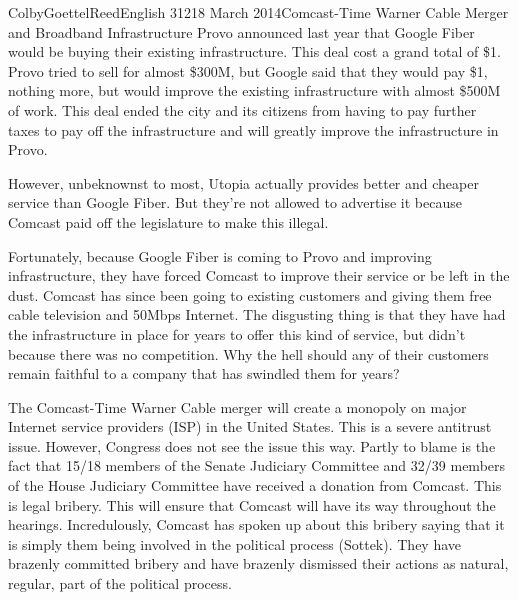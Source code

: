 \documentclass[12pt]{article}
\begin{document}
\begin{mla}{Colby}{Goettel}{Reed}{English 312}{18 March 2014}{Comcast-Time Warner Cable Merger and Broadband Infrastructure}
Provo announced last year that Google Fiber would be buying their existing infrastructure. This deal cost a grand total of \$1. Provo tried to sell for almost \$300M, but Google said that they would pay \$1, nothing more, but would improve the existing infrastructure with almost \$500M of work. This deal ended the city and its citizens from having to pay further taxes to pay off the infrastructure and will greatly improve the infrastructure in Provo.

However, unbeknownst to most, Utopia actually provides better and cheaper service than Google Fiber. But they're not allowed to advertise it because Comcast paid off the legislature to make this illegal.

Fortunately, because Google Fiber is coming to Provo and improving infrastructure, they have forced Comcast to improve their service or be left in the dust. Comcast has since been going to existing customers and giving them free cable television and 50Mbps Internet. The disgusting thing is that they have had the infrastructure in place for years to offer this kind of service, but didn't because there was no competition. Why the hell should any of their customers remain faithful to a company that has swindled them for years?

The Comcast-Time Warner Cable merger will create a monopoly on major Internet service providers (ISP) in the United States. This is a severe antitrust issue. However, Congress does not see the issue this way. Partly to blame is the fact that 15/18 members of the Senate Judiciary Committee and 32/39 members of the House Judiciary Committee have received a donation from Comcast. This is legal bribery. This will ensure that Comcast will have its way throughout the hearings. Incredulously, Comcast has spoken up about this bribery saying that it is simply them being involved in the political process (Sottek). They have brazenly committed bribery and have brazenly dismissed their actions as natural, regular, part of the political process.





\end{mla}
\end{document}

